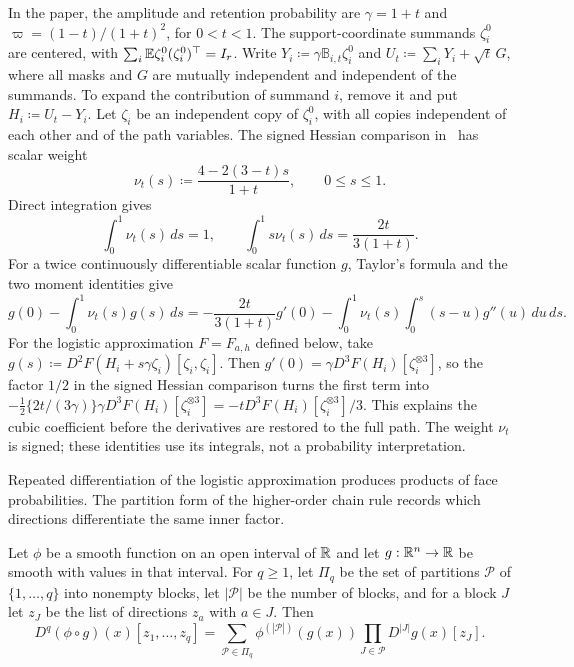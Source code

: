 In the paper, the amplitude and retention probability are
\(\gamma=1+t\) and \(\varpi=(1-t)/(1+t)^2\), for \(0<t<1\).
The support-coordinate summands \(\zeta_i^0\) are centered, with
\(\sum_i\mathbb E\zeta_i^0(\zeta_i^0)^\top=I_r\). Write
\(Y_i\coloneqq\gamma\mathbb B_{i,t}\zeta_i^0\) and
\(U_t\coloneqq\sum_iY_i+\sqrt t\,G\), where all masks and \(G\)
are mutually independent and independent of the summands. To expand the
contribution of summand \(i\), remove it and put \(H_i\coloneqq U_t-Y_i\).
Let \(\zeta_i\) be an independent copy of \(\zeta_i^0\), with all copies
independent of each other and of the path variables. The signed Hessian
comparison in~ has scalar weight
\[
 \nu_t(s)\coloneqq \frac{4-2(3-t)s}{1+t},\qquad 0\le s\le1.
\]
Direct integration gives
\[
 \int_0^1\nu_t(s)\,ds=1,\qquad
 \int_0^1s\nu_t(s)\,ds=\frac{2t}{3(1+t)}.
\]
For a twice continuously differentiable scalar function \(g\),
Taylor's formula and the two moment identities give
\[
 g(0)-\int_0^1\nu_t(s)g(s)\,ds
 =-\frac{2t}{3(1+t)}g'(0)
   -\int_0^1\nu_t(s)\int_0^s(s-u)g''(u)\,du\,ds.
\]
For the logistic approximation \(F=F_{a,h}\) defined below, take
\(g(s)\coloneqq D^2F(H_i+s\gamma\zeta_i)[\zeta_i,\zeta_i]\).
Then \(g'(0)=\gamma D^3F(H_i)[\zeta_i^{\otimes3}]\), so
the factor \(1/2\) in the signed Hessian comparison turns the first
term into
\(-\tfrac12\{2t/(3\gamma)\}\gamma
 D^3F(H_i)[\zeta_i^{\otimes3}]
 =-tD^3F(H_i)[\zeta_i^{\otimes3}]/3\). This explains the
cubic coefficient before the derivatives are restored to the full path.
The weight \(\nu_t\) is signed; these identities use its
integrals, not a probability interpretation.

Repeated differentiation of the logistic approximation produces products
of face probabilities. The partition form of the higher-order chain
rule records which directions differentiate the same inner factor.

\begin{fact}\label{tb:faa}
Let \(\phi\) be a smooth function on an open interval of \(\mathbb R\) and let
\(g:\mathbb R^n\to\mathbb R\) be smooth with values in that interval. For \(q\ge1\), let
\(\Pi_q\) be the set of partitions \(\mathcal P\) of \(\{1,\ldots,q\}\) into
nonempty blocks, let \(|\mathcal P|\) be the number of blocks, and for a
block \(J\) let \(z_J\) be the list of directions \(z_a\) with
\(a\in J\). Then
\[
 D^q(\phi\circ g)(x)[z_1,\ldots,z_q]
 =\sum_{\mathcal P\in\Pi_q}\phi^{(|\mathcal P|)}(g(x))
  \prod_{J\in\mathcal P}D^{|J|}g(x)[z_J].
\]
\end{fact}

